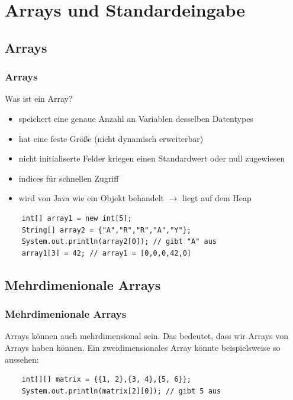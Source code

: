 \section{Arrays und Standardeingabe}

\subsection{Arrays}
\begin{frame}[fragile]
\frametitle{Arrays}
Was ist ein Array?
\begin{itemize}
    \item speichert eine genaue Anzahl an Variablen desselben Datentypes
    \item hat eine feste Größe (nicht dynamisch erweiterbar)
    \item nicht initialiserte Felder kriegen einen Standardwert oder null zugewiesen
    \item indices für schnellen Zugriff
    \item wird von Java wie ein Objekt behandelt $\rightarrow$ liegt auf dem Heap
\end{itemize}
\begin{lstlisting}
    int[] array1 = new int[5];
    String[] array2 = {"A","R","R","A","Y"};
    System.out.println(array2[0]); // gibt "A" aus
    array1[3] = 42; // array1 = [0,0,0,42,0]
\end{lstlisting}
\end{frame}

\subsection{Mehrdimenionale Arrays}
\begin{frame}[fragile]
\frametitle{Mehrdimenionale Arrays}
Arrays können auch mehrdimensional sein. Das bedeutet, dass wir Arrays von Arrays haben können. Ein zweidimensionales Array könnte beispielsweise so aussehen:
\begin{lstlisting}
    int[][] matrix = {{1, 2},{3, 4},{5, 6}};
    System.out.println(matrix[2][0]); // gibt 5 aus

\end{lstlisting}
\end{frame}
